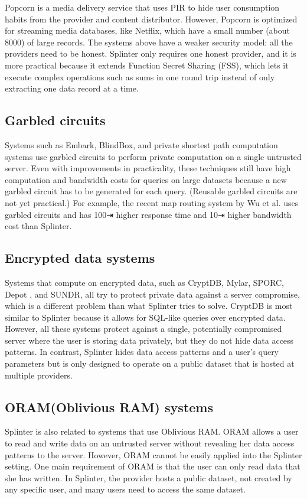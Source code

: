 \documentclass[12pt,a4paper]{article}
\begin{document}
\begin{multicols}{2}
Popcorn is a media delivery service that uses 
PIR to hide user consumption habits from the 
provider and content distributor. However, Popcorn 
is optimized for streaming media databases, like 
Netflix, which have a small number (about 8000) of 
large records.
The systems above have a weaker security model: all
the providers need to be honest. Splinter only 
requires one honest provider, and it is more 
practical because it extends Function Secret 
Sharing (FSS), which lets it execute 
complex operations such as sums in one round trip 
instead of only extracting one data record at a 
time.
\subsection{Garbled circuits}
Systems such as Embark, BlindBox, and 
private shortest path computation systems 
use garbled circuits to perform private 
computation on a single untrusted server. Even with 
improvements in practicality, these techniques 
still have high computation and bandwidth costs for 
queries on large datasets because a new garbled 
circuit has to be generated for each query. 
(Reusable garbled circuits are not yet 
practical.) For example, the recent map routing 
system by Wu et al. uses garbled circuits and 
has 100⇥ higher response time and 10⇥ higher
bandwidth cost than Splinter.
\subsection{Encrypted data systems}
Systems that compute on encrypted data, such as CryptDB, Mylar, SPORC, Depot , and SUNDR, all try to protect private data against a server compromise, which is a different problem than what Splinter tries to solve. CryptDB is most similar to Splinter because it allows for SQL-like queries over encrypted data. However, all these systems protect against a single, potentially compromised server where the user is storing data privately, but they do not hide data access patterns. In contrast, Splinter hides data access patterns and a user’s query parameters but is only designed to operate on a public dataset that is hosted at multiple providers.
\subsection{ORAM(Oblivious RAM) systems}
Splinter is also related to systems that use Oblivious RAM. ORAM allows a user to read and write data on an untrusted server without revealing her data access patterns to the server. However, ORAM cannot be easily applied into the Splinter setting. One main requirement of ORAM is that the user can only read data that she has written. In Splinter, the provider hosts a public dataset, not created by any specific user, and many users need to access the same dataset.

\end{multicols}
\end{document}
